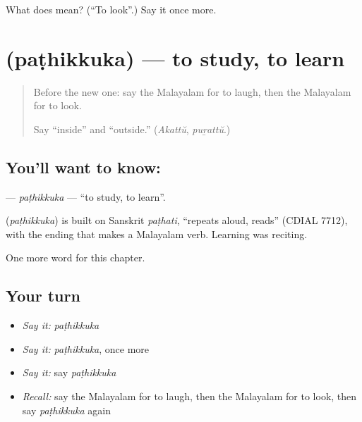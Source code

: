 \begin{tcolorbox}[breakable,colback=teal!4,colframe=teal!35!black,title={Before you move on}]
What does  mean? (\textquotedblleft{}To look\textquotedblright{}.) Say it once more.
\end{tcolorbox}
\section[\texorpdfstring{\ml{പഠിക്കുക} (paṭhikkuka)}{പഠിക്കുക (paṭhikkuka)}]{ (paṭhikkuka) — to study, to learn}

\label{lesson:ML-C173-pathikkuka}



\begin{quote}
Before the new one: say the Malayalam for to laugh, then the Malayalam for to look.

Say \textquotedblleft{}inside\textquotedblright{} and \textquotedblleft{}outside.\textquotedblright{} (\emph{Akattŭ}, \emph{puṟattŭ}.)
\end{quote}

\subsection*{You'll want to know: }
\textbf{} — \emph{paṭhikkuka} — \textquotedblleft{}to study, to learn\textquotedblright{}.

\begin{cousinweb}
\textbf{} (\emph{paṭhikkuka}) is built on Sanskrit \emph{paṭhati}, \textquotedblleft{}repeats aloud, reads\textquotedblright{} (CDIAL 7712), with the ending that makes a Malayalam verb. Learning was reciting.
\end{cousinweb}

\begin{grammarlens}[title={What you've built}]
One more word for this chapter.
\end{grammarlens}

\subsection*{Your turn}
\begin{itemize}
\raggedright
  \item \emph{Say it:} \emph{paṭhikkuka}
  \item \emph{Say it:} \emph{paṭhikkuka}, once more
  \item \emph{Say it:} say \emph{paṭhikkuka}
  \item \emph{Recall:} say the Malayalam for to laugh, then the Malayalam for to look, then say \emph{paṭhikkuka} again
\end{itemize}

